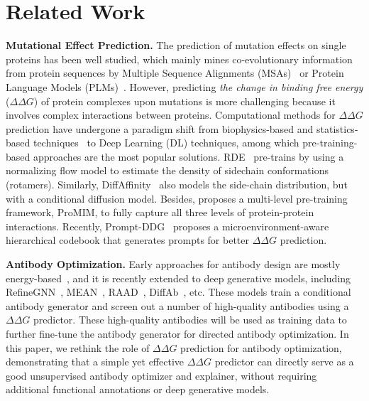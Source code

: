 \section{Related Work}
\vspace{-0.3em}
\textbf{Mutational Effect Prediction.}
The prediction of mutation effects on single proteins has been well studied, which mainly mines co-evolutionary information from protein sequences by Multiple Sequence Alignments (MSAs)~\citep{frazer2021disease,luo2021ecnet} or Protein Language Models (PLMs)~\citep{meier2021language,notin2022tranception}. However, predicting \emph{the change in binding free energy} ($\Delta\Delta G$) of protein complexes upon mutations is more challenging because it involves complex interactions between proteins. Computational methods for $\Delta\Delta G$ prediction have undergone a paradigm shift from biophysics-based and statistics-based techniques~\citep{schymkowitz2005foldx,park2016simultaneous} to Deep Learning (DL) techniques, among which pre-training-based approaches are the most popular solutions. RDE~\citep{luo2023rotamer} pre-trains by using a normalizing flow model to estimate the density of sidechain conformations (rotamers). Similarly, DiffAffinity~\citep{liu2023predicting} also models the side-chain distribution, but with a conditional diffusion model. Besides, \cite{mo2024multi} proposes a multi-level pre-training framework, ProMIM, to fully capture all three levels of protein-protein interactions. Recently, Prompt-DDG~\citep{wu2024learning} proposes a microenvironment-aware hierarchical codebook that generates prompts for better $\Delta\Delta G$ prediction.

\textbf{Antibody Optimization.} Early approaches for antibody design are mostly energy-based~\citep{adolf2018rosettaantibodydesign,lapidoth2015abdesign}, and it is recently extended to deep generative models, including RefineGNN~\citep{jin2021iterative}, MEAN~\citep{kong2022conditional}, RAAD~\citep{wu2024relation}, DiffAb~\citep{luo2022antigen}, etc. These models train a conditional antibody generator and screen out a number of high-quality antibodies using a $\Delta\Delta G$ predictor. These high-quality antibodies will be used as training data to further fine-tune the antibody generator for directed antibody optimization. In this paper, we rethink the role of $\Delta\Delta G$ prediction for antibody optimization, demonstrating that a simple yet effective $\Delta\Delta G$ predictor can directly serve as a good unsupervised antibody optimizer and explainer, without requiring additional functional annotations or deep generative models.


\vspace{-0.5em}